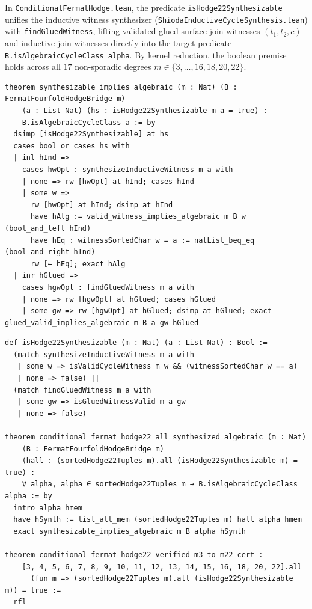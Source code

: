 \documentclass[11pt,a4paper]{article}
\begin{document}
In \texttt{ConditionalFermatHodge.lean}, the predicate \texttt{isHodge22Synthesizable} unifies the inductive witness synthesizer (\texttt{ShiodaInductiveCycleSynthesis.lean}) with \texttt{findGluedWitness}, lifting validated glued surface-join witnesses $(t_1, t_2, c)$ and inductive join witnesses directly into the target predicate \texttt{B.isAlgebraicCycleClass alpha}. By kernel reduction, the boolean premise holds across all $17$ non-sporadic degrees $m \in \{3,\dots,16,18,20,22\}$.

\begin{lstlisting}[caption={Soundness proof lifting both witness branches into \texttt{FermatFourfoldHodgeBridge} in \texttt{ConditionalFermatHodge.lean}.}]
theorem synthesizable_implies_algebraic (m : Nat) (B : FermatFourfoldHodgeBridge m)
    (a : List Nat) (hs : isHodge22Synthesizable m a = true) :
    B.isAlgebraicCycleClass a := by
  dsimp [isHodge22Synthesizable] at hs
  cases bool_or_cases hs with
  | inl hInd =>
    cases hwOpt : synthesizeInductiveWitness m a with
    | none => rw [hwOpt] at hInd; cases hInd
    | some w =>
      rw [hwOpt] at hInd; dsimp at hInd
      have hAlg := valid_witness_implies_algebraic m B w (bool_and_left hInd)
      have hEq : witnessSortedChar w = a := natList_beq_eq (bool_and_right hInd)
      rw [← hEq]; exact hAlg
  | inr hGlued =>
    cases hgwOpt : findGluedWitness m a with
    | none => rw [hgwOpt] at hGlued; cases hGlued
    | some gw => rw [hgwOpt] at hGlued; dsimp at hGlued; exact glued_valid_implies_algebraic m B a gw hGlued
\end{lstlisting}

\begin{lstlisting}[caption={Glued witness extraction and end-to-end conditional theorem in \texttt{ConditionalFermatHodge.lean}.}]
def isHodge22Synthesizable (m : Nat) (a : List Nat) : Bool :=
  (match synthesizeInductiveWitness m a with
   | some w => isValidCycleWitness m w && (witnessSortedChar w == a)
   | none => false) ||
  (match findGluedWitness m a with
   | some gw => isGluedWitnessValid m a gw
   | none => false)

theorem conditional_fermat_hodge22_all_synthesized_algebraic (m : Nat)
    (B : FermatFourfoldHodgeBridge m)
    (hall : (sortedHodge22Tuples m).all (isHodge22Synthesizable m) = true) :
    ∀ alpha, alpha ∈ sortedHodge22Tuples m → B.isAlgebraicCycleClass alpha := by
  intro alpha hmem
  have hSynth := list_all_mem (sortedHodge22Tuples m) hall alpha hmem
  exact synthesizable_implies_algebraic m B alpha hSynth

theorem conditional_fermat_hodge22_verified_m3_to_m22_cert :
    [3, 4, 5, 6, 7, 8, 9, 10, 11, 12, 13, 14, 15, 16, 18, 20, 22].all
      (fun m => (sortedHodge22Tuples m).all (isHodge22Synthesizable m)) = true :=
  rfl
\end{lstlisting}
\end{document}
